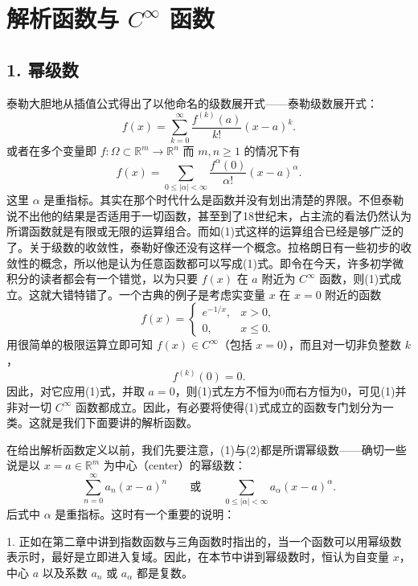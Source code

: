 \section{解析函数与 \texorpdfstring{$C^\infty$}{C-infinity} 函数}

\subsection*{1. 幂级数}

泰勒大胆地从插值公式得出了以他命名的级数展开式——泰勒级数展开式：
\begin{equation}
 f(x)=\sum_{k=0}^{\infty}\frac{f^{(k)}(a)}{k!}(x-a)^k.
 \tag{1}
\end{equation}
或者在多个变量即 $f:\Omega\subset\mathbb R^m\to\mathbb R^n$ 而 $m,n\ge1$ 的情况下有
\begin{equation}
 f(x)=\sum_{0\le|\alpha|<\infty}\frac{f^\alpha(0)}{\alpha!}(x-a)^\alpha.
 \tag{2}
\end{equation}
这里 $\alpha$ 是重指标。其实在那个时代什么是函数并没有划出清楚的界限。不但泰勒说不出他的结果是否适用于一切函数，甚至到了18世纪末，占主流的看法仍然认为所谓函数就是有限或无限的运算组合。而如(1)式这样的运算组合已经是够广泛的了。关于级数的收敛性，泰勒好像还没有这样一个概念。拉格朗日有一些初步的收敛性的概念，所以他是认为任意函数都可以写成(1)式。即令在今天，许多初学微积分的读者都会有一个错觉，以为只要 $f(x)$ 在 $a$ 附近为 $C^\infty$ 函数，则(1)式成立。这就大错特错了。一个古典的例子是考虑实变量 $x$ 在 $x=0$ 附近的函数
\[
 f(x)=
 \begin{cases}
 e^{-1/x},&x>0,\\
 0,&x\le0.
 \end{cases}
\]
用很简单的极限运算立即可知 $f(x)\in C^\infty$（包括 $x=0$），而且对一切非负整数 $k$，
\[
 f^{(k)}(0)=0.
\]
因此，对它应用(1)式，并取 $a=0$，则(1)式左方不恒为0而右方恒为0，可见(1)并非对一切 $C^\infty$ 函数都成立。因此，有必要将使得(1)式成立的函数专门划分为一类。这就是我们下面要讲的解析函数。

在给出解析函数定义以前，我们先要注意，(1)与(2)都是所谓幂级数——确切一些说是以 $x=a\in\mathbb R^m$ 为中心（center）的幂级数：
\[
 \sum_{n=0}^{\infty}a_n(x-a)^n
 \qquad\text{或}\qquad
 \sum_{0\le|\alpha|<\infty}a_\alpha(x-a)^\alpha.
\]
后式中 $\alpha$ 是重指标。这时有一个重要的说明：

1. 正如在第二章中讲到指数函数与三角函数时指出的，当一个函数可以用幂级数表示时，最好是立即进入复域。因此，在本节中讲到幂级数时，恒认为自变量 $x$，中心 $a$ 以及系数 $a_n$ 或 $a_\alpha$ 都是复数。

